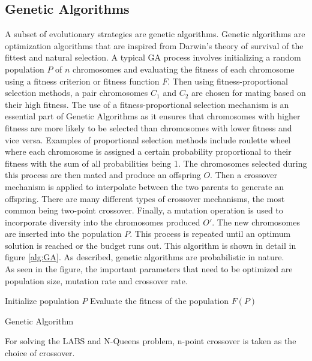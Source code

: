 \documentclass{article}
\begin{document}
\subsection{Genetic Algorithms}
A subset of evolutionary strategies are genetic algorithms. Genetic algorithms are optimization algorithms that are inspired from Darwin's theory of survival of the fittest and natural selection. A typical GA process involves initializing a random population $P$ of $n$ chromosomes and evaluating the fitness of each chromosome using a fitness criterion or fitness function $F$. Then using fitness-proportional selection methods, a pair chromosomes $C_1$ and $C_2$ are chosen for mating based on their high fitness. The use of a fitness-proportional selection mechanism is an essential part of Genetic Algorithms as it ensures that chromosomes with higher fitness are more likely to be selected than chromosomes with lower fitness and vice versa. Examples of proportional selection methods include roulette wheel where each chromosome is assigned a certain probability proportional to their fitness with the sum of all probabilities being 1. The chromosomes selected during this process are then mated and produce an offspring $O$. Then a crossover mechanism is applied to interpolate between the two parents to generate an offspring. There are many different types of crossover mechanisms, the most common being two-point crossover. Finally, a mutation operation is used to incorporate diversity into the chromosomes produced $O'$.  The new chromosomes are inserted into the population $P$. This process is repeated until an optimum solution is reached or the budget runs out. This algorithm is shown in detail in figure \ref{alg:GA}. As described, genetic algorithms are probabilistic in nature. \\
As seen in the figure, the important parameters that need to be optimized are population size, mutation rate and crossover rate. \\

\begin{algorithm}[H]
\SetAlgoLined
{}

\BlankLine
Initialize population $P$\;
Evaluate the fitness of the population $F(P)$\;
\caption{Genetic Algorithm}\label{alg:GA}
\end{algorithm}
For solving the LABS and N-Queens problem,  n-point crossover is taken as the choice of crossover. 
\end{document}
